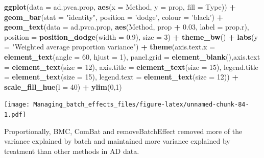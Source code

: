 \documentclass[]{book}
\newenvironment{Shaded}{\begin{snugshade}}{\end{snugshade}}
\newcommand{\KeywordTok}[1]{\textcolor[rgb]{0.13,0.29,0.53}{\textbf{#1}}}
\newcommand{\DataTypeTok}[1]{\textcolor[rgb]{0.13,0.29,0.53}{#1}}
\newcommand{\DecValTok}[1]{\textcolor[rgb]{0.00,0.00,0.81}{#1}}
\newcommand{\FloatTok}[1]{\textcolor[rgb]{0.00,0.00,0.81}{#1}}
\newcommand{\StringTok}[1]{\textcolor[rgb]{0.31,0.60,0.02}{#1}}
\newcommand{\OperatorTok}[1]{\textcolor[rgb]{0.81,0.36,0.00}{\textbf{#1}}}
\newcommand{\NormalTok}[1]{#1}
\begin{document}
\begin{Shaded}
\begin{Highlighting}[]
\KeywordTok{ggplot}\NormalTok{(}\DataTypeTok{data =}\NormalTok{ ad.pvca.prop, }\KeywordTok{aes}\NormalTok{(}\DataTypeTok{x =}\NormalTok{ Method, }\DataTypeTok{y =}\NormalTok{ prop, }\DataTypeTok{fill =}\NormalTok{ Type)) }\OperatorTok{+}\StringTok{ }
\StringTok{  }\KeywordTok{geom_bar}\NormalTok{(}\DataTypeTok{stat =} \StringTok{"identity"}\NormalTok{, }\DataTypeTok{position =} \StringTok{'dodge'}\NormalTok{, }\DataTypeTok{colour =} \StringTok{'black'}\NormalTok{) }\OperatorTok{+}\StringTok{ }
\StringTok{  }\KeywordTok{geom_text}\NormalTok{(}\DataTypeTok{data =}\NormalTok{ ad.pvca.prop, }\KeywordTok{aes}\NormalTok{(Method, prop }\OperatorTok{+}\StringTok{ }\FloatTok{0.03}\NormalTok{, }\DataTypeTok{label =}\NormalTok{ prop.r), }
            \DataTypeTok{position =} \KeywordTok{position_dodge}\NormalTok{(}\DataTypeTok{width =} \FloatTok{0.9}\NormalTok{), }\DataTypeTok{size =} \DecValTok{3}\NormalTok{) }\OperatorTok{+}\StringTok{ }\KeywordTok{theme_bw}\NormalTok{() }\OperatorTok{+}\StringTok{ }
\StringTok{  }\KeywordTok{labs}\NormalTok{(}\DataTypeTok{y =} \StringTok{"Weighted average proportion variance"}\NormalTok{) }\OperatorTok{+}\StringTok{ }
\StringTok{  }\KeywordTok{theme}\NormalTok{(}\DataTypeTok{axis.text.x =} \KeywordTok{element_text}\NormalTok{(}\DataTypeTok{angle =} \DecValTok{60}\NormalTok{, }\DataTypeTok{hjust =} \DecValTok{1}\NormalTok{), }
        \DataTypeTok{panel.grid =} \KeywordTok{element_blank}\NormalTok{(),}\DataTypeTok{axis.text =} \KeywordTok{element_text}\NormalTok{(}\DataTypeTok{size =} \DecValTok{12}\NormalTok{), }
        \DataTypeTok{axis.title =} \KeywordTok{element_text}\NormalTok{(}\DataTypeTok{size =} \DecValTok{15}\NormalTok{), }\DataTypeTok{legend.title =} \KeywordTok{element_text}\NormalTok{(}\DataTypeTok{size =} \DecValTok{15}\NormalTok{), }
        \DataTypeTok{legend.text =} \KeywordTok{element_text}\NormalTok{(}\DataTypeTok{size =} \DecValTok{12}\NormalTok{)) }\OperatorTok{+}\StringTok{ }\KeywordTok{scale_fill_hue}\NormalTok{(}\DataTypeTok{l =} \DecValTok{40}\NormalTok{) }\OperatorTok{+}\StringTok{ }\KeywordTok{ylim}\NormalTok{(}\DecValTok{0}\NormalTok{,}\DecValTok{1}\NormalTok{)}
\end{Highlighting}
\end{Shaded}

\texttt{[image: Managing\_batch\_effects\_files/figure-latex/unnamed-chunk-84-1.pdf]}

Proportionally, BMC, ComBat and removeBatchEffect removed more of the
variance explained by batch and maintained more variance explained by
treatment than other methods in AD data.
\end{document}
